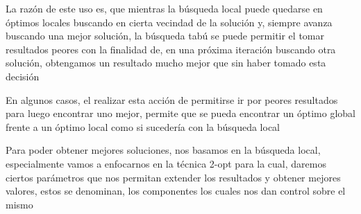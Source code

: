 \documentclass[10pt,a4paper]{article}
\begin{document}
La razón de este uso es, que mientras la búsqueda local puede quedarse en óptimos locales buscando en cierta vecindad de la solución y, siempre avanza buscando una mejor solución, la búsqueda tabú se puede permitir el tomar resultados peores con la finalidad de, en una próxima iteración buscando otra solución, obtengamos un resultado mucho mejor que sin haber tomado esta decisión

En algunos casos, el realizar esta acción de permitirse ir por peores resultados para luego encontrar uno mejor, permite que se pueda encontrar un óptimo global frente a un óptimo local como si sucedería con la búsqueda local

Para poder obtener mejores soluciones, nos basamos en la búsqueda local, especialmente vamos a enfocarnos en la técnica 2-opt para la cual, daremos ciertos parámetros que nos permitan extender los resultados y obtener mejores valores, estos se denominan, los componentes los cuales nos dan control sobre el mismo 
\end{document}
